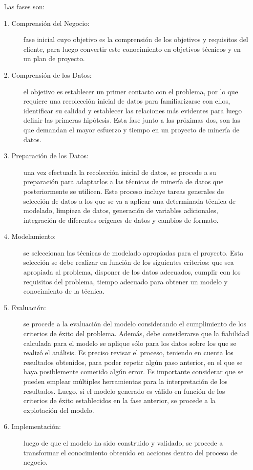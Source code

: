 Las fases son: 
\begin{description}
  \item[1. Comprensión del Negocio:] fase inicial cuyo objetivo es la comprensión de los objetivos y requisitos del cliente, para luego convertir este conocimiento en objetivos técnicos y en un plan de proyecto. 
  \item[2. Comprensión de los Datos:] el objetivo es establecer un primer contacto con el problema, por lo que requiere una recolección inicial de datos para familiarizarse con ellos, identificar su calidad y establecer las relaciones más evidentes para luego definir las primeras hipótesis. Esta fase junto a las próximas dos, son las que demandan el mayor esfuerzo y tiempo en un proyecto de minería de datos.
  \item[3. Preparación de los Datos:] una vez efectuada la recolección inicial de datos, se procede a su preparación para adaptarlos a las técnicas de minería de datos que posteriormente se utilicen. Este proceso incluye tareas generales de selección de datos a los que se va a aplicar una determinada técnica de modelado, limpieza de datos, generación de variables adicionales, integración de diferentes orígenes de datos y cambios de formato.
  \item[4. Modelamiento:] se seleccionan las técnicas de modelado apropiadas para el proyecto. Esta selección se debe realizar en función de los siguientes criterios: que sea apropiada al problema, disponer de los datos adecuados, cumplir con los requisitos del problema, tiempo adecuado para obtener un modelo y conocimiento de la técnica. 
  \item[5. Evaluación:] se procede a la evaluación del modelo considerando el cumplimiento de los criterios de éxito del problema. Además, debe considerarse que la fiabilidad calculada para el modelo se aplique sólo para los datos sobre los que se realizó el análisis. Es preciso revisar el proceso, teniendo en cuenta los resultados obtenidos, para poder repetir algún paso anterior, en el que se haya posiblemente cometido algún error. Es importante considerar que se pueden emplear múltiples herramientas para la interpretación de los resultados. Luego, si el modelo generado es válido en función de los criterios de éxito establecidos en la fase anterior, se procede a la explotación del modelo.
  \item[6. Implementación:] luego de que el modelo ha sido construido y validado, se procede a transformar el conocimiento obtenido en acciones dentro del proceso de negocio.
\end{description}

